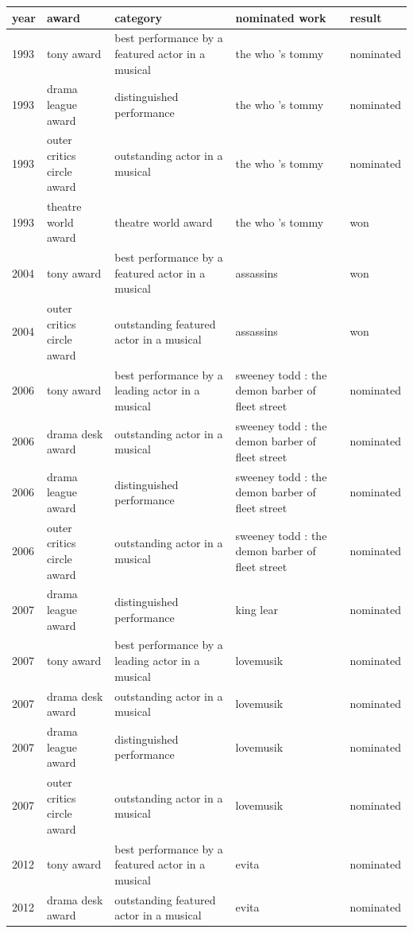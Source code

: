 \documentclass{article}
\begin{document}
\begin{tabular}{lllll}
\toprule
year & award & category & nominated work & result \\
\midrule
1993 & tony award & best performance by a featured actor in a musical & the who 's tommy & nominated \\
1993 & drama league award & distinguished performance & the who 's tommy & nominated \\
1993 & outer critics circle award & outstanding actor in a musical & the who 's tommy & nominated \\
1993 & theatre world award & theatre world award & the who 's tommy & won \\
2004 & tony award & best performance by a featured actor in a musical & assassins & won \\
2004 & outer critics circle award & outstanding featured actor in a musical & assassins & won \\
2006 & tony award & best performance by a leading actor in a musical & sweeney todd : the demon barber of fleet street & nominated \\
2006 & drama desk award & outstanding actor in a musical & sweeney todd : the demon barber of fleet street & nominated \\
2006 & drama league award & distinguished performance & sweeney todd : the demon barber of fleet street & nominated \\
2006 & outer critics circle award & outstanding actor in a musical & sweeney todd : the demon barber of fleet street & nominated \\
2007 & drama league award & distinguished performance & king lear & nominated \\
2007 & tony award & best performance by a leading actor in a musical & lovemusik & nominated \\
2007 & drama desk award & outstanding actor in a musical & lovemusik & nominated \\
2007 & drama league award & distinguished performance & lovemusik & nominated \\
2007 & outer critics circle award & outstanding actor in a musical & lovemusik & nominated \\
2012 & tony award & best performance by a featured actor in a musical & evita & nominated \\
2012 & drama desk award & outstanding featured actor in a musical & evita & nominated \\
\bottomrule
\end{tabular}
\end{document}
